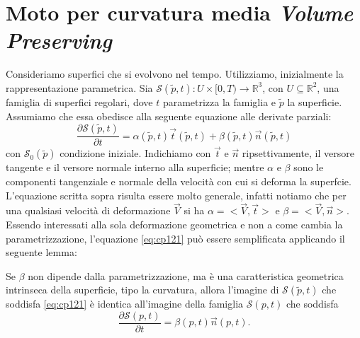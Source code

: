 \section{Moto per curvatura media \emph{Volume Preserving}}

Consideriamo superfici che si evolvono nel tempo. Utilizziamo, inizialmente la rappresentazione parametrica. Sia $\mathcal{S}(\tilde{p},t):U\times[0,T)\longrightarrow\mathbb{R}^3$, con $U\subseteq\mathbb{R}^2$, una famiglia di superfici regolari, dove $t$ parametrizza la famiglia e $\tilde{p}$ la superficie. Assumiamo che essa obedisce alla seguente equazione alle derivate parziali:
\begin{equation}
  \label{eq:cp121}
  \frac{\partial\mathcal{S}(\tilde{p},t)}{\partial t} = \alpha(\tilde{p},t)\vec{t}(\tilde{p},t) + \beta(\tilde{p},t)\vec{n}(\tilde{p},t)
\end{equation}
con $\mathcal{S}_0(\tilde{p})$ condizione iniziale. Indichiamo con $\vec{t}$ e $\vec{n}$ ripsettivamente, il versore tangente e il versore normale interno alla superficie; mentre $\alpha$ e $\beta$ sono le componenti tangenziale e normale della velocità con cui si deforma la superfcie. L'equazione scritta sopra risulta essere molto generale, infatti notiamo che per una qualsiasi velocità di deformazione $\vec{V}$ si ha $\alpha=<\vec{V},\vec{t}>$ e $\beta=<\vec{V},\vec{n}>$. Essendo interessati alla sola deformazione geometrica e non a come cambia la parametrizzazione, l'equazione \eqref{eq:cp121} può essere semplificata applicando il seguente lemma:
\begin{lemma}
\label{lemm:cp-121}
Se $\beta$ non dipende dalla parametrizzazione, ma è una caratteristica geometrica intrinseca della superficie, tipo la curvatura, allora l'imagine di $\mathcal{S}(\tilde{p},t)$ che soddisfa \eqref{eq:cp121} è identica all'imagine della famiglia $\mathcal{S}(p,t)$ che soddisfa
\begin{equation}
  \label{eq:cp122}
  \frac{\partial\mathcal{S}(p,t)}{\partial t} =\beta(p,t)\vec{n}(p,t).
\end{equation}
\end{lemma}

